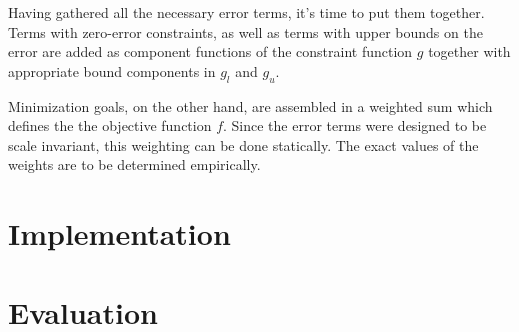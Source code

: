 \documentclass[a4paper]{article}
\begin{document}
				Having gathered all the necessary error terms, it's time to put them together. Terms with zero-error constraints, as well as terms with upper bounds on the error are added as component functions of the constraint function \(g\) together with appropriate bound components in \(g_l\) and \(g_u\).

				Minimization goals, on the other hand, are assembled in a weighted sum which defines the the objective function \(f\). Since the error terms were designed to be scale invariant, this weighting can be done statically. The exact values of the weights are to be determined empirically.

	\section{Implementation}


	\section{Evaluation}
\end{document}

